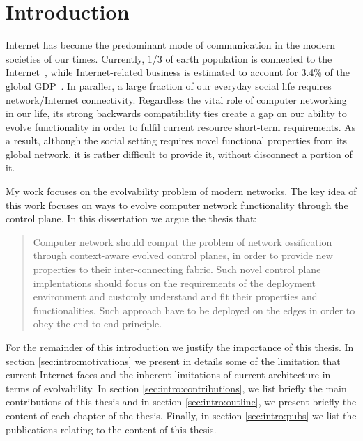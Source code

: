 \chapter{Introduction} \ifpdf
\graphicspath{{Introduction/IntroductionFigs/PNG/}{Introduction/IntroductionFigs/PDF/}{Introduction/IntroductionFigs/}}
\else
\graphicspath{{Introduction/IntroductionFigs/EPS/}{Introduction/IntroductionFigs/}}
\fi

Internet has become the predominant mode of communication in the modern
societies of our times. Currently, 1/3 of earth population is connected to the
Internet~\cite{itufacts2011}, while Internet-related business is estimated to
account for 3.4\% of the global GDP~\cite{duRausas:2011un}. In paraller, a large
fraction of our everyday social life requires network/Internet connectivity.
Regardless the vital role of computer networking in our life, its strong
backwards compatibility ties create a gap on our ability to evolve functionality
in order to fulfil current resource short-term requirements. As a result,
although the social setting requires novel functional properties from its global
network, it is rather difficult to provide it, without disconnect a portion of
it.

My work focuses on the evolvability problem of modern networks. The key idea of
this work focuses on ways to evolve computer network functionality through the
control plane. In this dissertation we argue the thesis that: 

\begin{quotation} Computer network should compat the problem of network
  ossification through context-aware evolved control planes, in order to provide
  new properties to their inter-connecting fabric. Such novel control plane
  implentations should focus on the requirements of the deployment environment
  and customly understand and fit their properties and functionalities. Such
  approach have to be deployed on the edges in order to obey the end-to-end
  principle.  \end{quotation}

For the remainder of this introduction we justify the importance of this thesis.
In section \ref{sec:intro:motivations} we present in details some of the
limitation that current Internet faces and the inherent limitations of current
architecture in terms of evolvability. In section \ref{sec:intro:contributions},
we list briefly the main contributions of this thesis and in section
\ref{sec:intro:outline}, we present briefly the content of each chapter of the
thesis. Finally, in section \ref{sec:intro:pubs} we list the publications
relating to the content of this thesis. 


